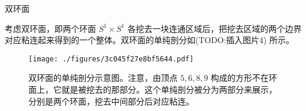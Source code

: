 \begin{example}{双环面}

考虑双环面，即两个环面 $S^1\times S^1$ 各挖去一块连通区域后，把挖去区域的两个边界对应粘连起来得到的一个整体。双环面的单纯剖分如(TODO:插入图片4) 所示。

\begin{figure}[ht]
\centering
\texttt{[image: ./figures/3c045f27e8bf5644.pdf]}
\caption{双环面的单纯剖分示意图。注意，由顶点 $5, 6, 8, 9$ 构成的方形不在环面上，它就是被挖去的那部分。这个单纯剖分被分为两部分来展示，分别是两个环面，挖去中间部分后对应粘连。} \label{fig_SimCom_6}
\end{figure}


\end{example}
